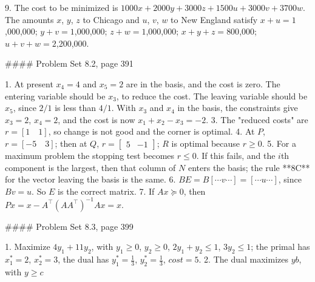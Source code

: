 9. The cost to be minimized is \(1000x+2000y+3000z+1500u+3000v+3700w\). The amounts \(x\), \(y\), \(z\) to Chicago and \(u\), \(v\), \(w\) to New England satisfy \(x+u=1\),000,000; \(y+v=1\),000,000; \(z+w=1\),000,000; \(x+y+z=800\),000; \(u+v+w=2\),200,000.

#### Problem Set 8.2, page 391

1. At present \(x_{4}=4\) and \(x_{5}=2\) are in the basis, and the cost is zero. The entering variable should be \(x_{3}\), to reduce the cost. The leaving variable should be \(x_{5}\), since \(2/1\) is less than \(4/1\). With \(x_{3}\) and \(x_{4}\) in the basis, the constraints give \(x_{3}=2\), \(x_{4}=2\), and the cost is now \(x_{1}+x_{2}-x_{3}=-2\).
3. The "reduced costs" are \(r=[1\quad 1]\), so change is not good and the corner is optimal.
4. At \(P\), \(r=[-5\quad 3]\); then at \(Q\), \(r=\begin{bmatrix}5&-1\end{bmatrix}\); \(R\) is optimal because \(r\geq 0\).
5. For a maximum problem the stopping test becomes \(r\leq 0\). If this fails, and the \(i\)th component is the largest, then that column of \(N\) enters the basis; the rule **8C** for the vector leaving the basis is the same.
6. \(BE=B[\cdots v\cdots]=[\cdots u\cdots]\), since \(Bv=u\). So \(E\) is the correct matrix.
7. If \(Ax\succeq 0\), then \(Px=x-A^{\top}(AA^{\top})^{-1}Ax=x\).

#### Problem Set 8.3, page 399

1. Maximize \(4y_{1}+11y_{2}\), with \(y_{1}\geq 0\), \(y_{2}\geq 0\), \(2y_{1}+y_{2}\leq 1\), \(3y_{2}\leq 1\); the primal has \(x_{1}^{\ast}=2\), \(x_{2}^{\ast}=3\), the dual has \(y_{1}^{\ast}=\frac{1}{3}\), \(y_{2}^{\ast}=\frac{1}{3}\), \(cost=5\).
2. The dual maximizes \(yb\), with \(y\geq c\) 